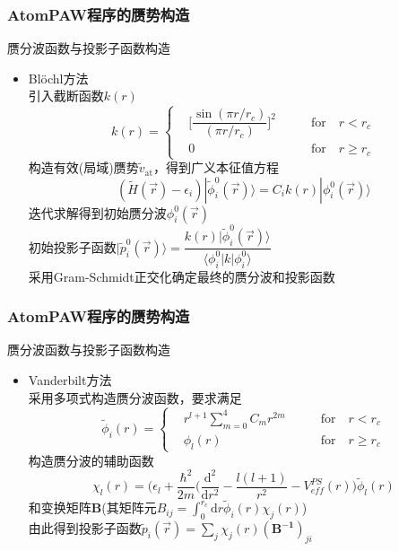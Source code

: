 \documentclass[cjk,slidestop,compress,mathserif,blue]{beamer}
\begin{document}
\frame
{
	\frametitle{\textrm{AtomPAW}程序的赝势构造}
	赝分波函数与投影子函数构造
	\begin{itemize}
		\item \textrm{Bl\"ochl}方法\\
			引入截断函数$k(r)$
	\begin{displaymath}
		k(r)=\left\{
			\begin{aligned}
				&\bigg[\dfrac{\sin({\pi r/r_c})}{(\pi r/r_c)}\bigg]^2\qquad &\mathrm{for}\quad r<r_c \\
				&0\qquad &\mathrm{for}\quad r\geqslant r_c
			\end{aligned}
			\right.
	\end{displaymath}
	构造有效(局域)赝势$\tilde v_{\mathrm{at}}$，得到广义本征值方程
	$$(\tilde H(\vec r)-\epsilon_i)|\tilde\phi_i^0(\vec r)\rangle=C_ik(r)|\phi_i^0(\vec r)\rangle$$
	迭代求解得到初始赝分波$\phi_i^0(\vec r)$\\
	初始投影子函数$|\tilde p_i^0(\vec r)\rangle=\dfrac{k(r)|\tilde\phi_i^0(\vec r)\rangle}{\langle\phi_i^0|k|\phi_i^0\rangle}$\\
	采用\textrm{Gram-Schmidt}正交化确定最终的赝分波和投影函数
	\end{itemize}
}

\frame
{
	\frametitle{\textrm{AtomPAW}程序的赝势构造}
	赝分波函数与投影子函数构造
	\begin{itemize}
		\item \textrm{Vanderbilt}方法\\
			采用多项式构造赝分波函数，要求满足
	\begin{displaymath}
		\tilde\phi_i(r)=\left\{
			\begin{aligned}
				&r^{l+1}\sum_{m=0}^4C_mr^{2m}\qquad &\mathrm{for}\quad r<r_c \\
				&\phi_l(r)\qquad &\mathrm{for}\quad r\geqslant r_c
			\end{aligned}
			\right.
	\end{displaymath}
	构造赝分波的辅助函数
	$$\chi_l(r)=\bigg(\epsilon_l+\dfrac{\hbar^2}{2m}(\dfrac{\mathrm{d}^2}{\mathrm{d}r^2}-\dfrac{l(l+1)}{r^2}-V_{e\!f\!f}^{PS}(r)\bigg)\tilde\phi_l(r)$$
	和变换矩阵$\mathbf{B}$(其矩阵元$B_{ij}=\int_0^{r_c}\mathrm{d}r\tilde\phi_i(r)\chi_j(r)$)\\
	由此得到投影子函数$\tilde p_i(\vec r)=\sum\limits_{j}\chi_j(r)(\mathbf{B^{-1}})_{ji}$
	\end{itemize}
}
\end{document}
